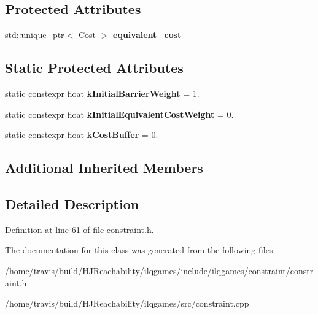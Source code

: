 \subsection*{Protected Attributes}
\begin{DoxyCompactItemize}
\item 
std\+::unique\+\_\+ptr$<$ \hyperlink{classilqgames_1_1_cost}{Cost} $>$ {\bfseries equivalent\+\_\+cost\+\_\+}\hypertarget{classilqgames_1_1_constraint_aa33d6b05a13fe556b844656f07753e37}{}\label{classilqgames_1_1_constraint_aa33d6b05a13fe556b844656f07753e37}

\end{DoxyCompactItemize}
\subsection*{Static Protected Attributes}
\begin{DoxyCompactItemize}
\item 
static constexpr float {\bfseries k\+Initial\+Barrier\+Weight} = 1.\hypertarget{classilqgames_1_1_constraint_a1c1566fc2fa74e58b54fae57c07b7af8}{}\label{classilqgames_1_1_constraint_a1c1566fc2fa74e58b54fae57c07b7af8}

\item 
static constexpr float {\bfseries k\+Initial\+Equivalent\+Cost\+Weight} = 0.\hypertarget{classilqgames_1_1_constraint_a64fd12449a7f42d19c68b568140699a3}{}\label{classilqgames_1_1_constraint_a64fd12449a7f42d19c68b568140699a3}

\item 
static constexpr float {\bfseries k\+Cost\+Buffer} = 0.\hypertarget{classilqgames_1_1_constraint_aaef1da643690381eca61569190863129}{}\label{classilqgames_1_1_constraint_aaef1da643690381eca61569190863129}

\end{DoxyCompactItemize}
\subsection*{Additional Inherited Members}


\subsection{Detailed Description}


Definition at line 61 of file constraint.\+h.



The documentation for this class was generated from the following files\+:\begin{DoxyCompactItemize}
\item 
/home/travis/build/\+H\+J\+Reachability/ilqgames/include/ilqgames/constraint/constraint.\+h\item 
/home/travis/build/\+H\+J\+Reachability/ilqgames/src/constraint.\+cpp\end{DoxyCompactItemize}
